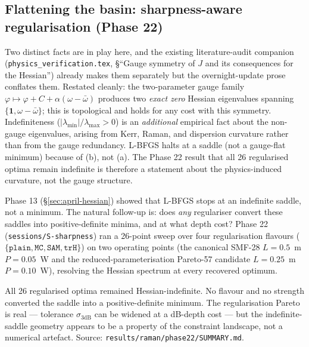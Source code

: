 \documentclass[12pt,a4paper]{article}
\theoremstyle{definition}
\begin{document}
\subsection{Flattening the basin: sharpness-aware regularisation (Phase 22)}
\label{sec:april-sharpness}

Two distinct facts are in play here, and the existing
literature-audit companion (\texttt{physics\_verification.tex},
\S``Gauge symmetry of $J$ and its consequences for the Hessian'')
already makes them separately but the overnight-update prose
conflates them. Restated cleanly: the two-parameter gauge family
$\varphi \mapsto \varphi + C + \alpha (\omega - \bar\omega)$
produces two \emph{exact zero} Hessian eigenvalues spanning
$\{\mathbf{1}, \omega - \bar\omega\}$; this is topological and
holds for any cost with this symmetry. Indefiniteness
($|\lambda_\text{min}|/\lambda_\text{max} > 0$) is an
\emph{additional} empirical fact about the non-gauge eigenvalues,
arising from Kerr, Raman, and dispersion curvature rather than
from the gauge redundancy. L-BFGS halts at a saddle (not a
gauge-flat minimum) because of (b), not (a). The Phase 22 result
that all 26 regularised optima remain indefinite is therefore a
statement about the physics-induced curvature, not the gauge
structure.

Phase 13 (\S\ref{sec:april-hessian}) showed that L-BFGS stops at an
indefinite saddle, not a minimum. The natural follow-up is: does
\emph{any} regulariser convert these saddles into positive-definite
minima, and at what depth cost? Phase 22 (\texttt{sessions/S-sharpness})
ran a 26-point sweep over four regularisation flavours
($\{\texttt{plain}, \texttt{MC}, \texttt{SAM}, \texttt{trH}\}$) on two
operating points (the canonical SMF-28 $L{=}0.5$~m $P{=}0.05$~W and
the reduced-parameterisation Pareto-57 candidate $L{=}0.25$~m
$P{=}0.10$~W), resolving the Hessian spectrum at every recovered
optimum.

\begin{keyresult}
All 26 regularised optima remained Hessian-indefinite. No flavour
and no strength converted the saddle into a positive-definite
minimum. The regularisation Pareto is real --- tolerance
$\sigma_{3\text{dB}}$ can be widened at a dB-depth cost --- but the
indefinite-saddle geometry appears to be a property of the
constraint landscape, not a numerical artefact. Source:
\texttt{results/raman/phase22/SUMMARY.md}.
\end{keyresult}
\end{document}
